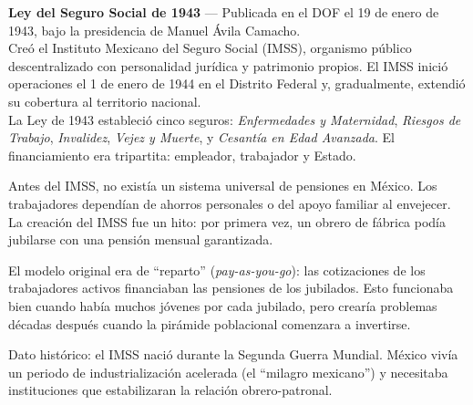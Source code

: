 \documentclass[11pt,a4paper]{report}
\begin{document}
\begin{tcolorbox}[colback=blue!5!white, colframe=blue!75!black, title=\textbf{Definici\'on Formal}]
\textbf{Ley del Seguro Social de 1943} --- Publicada en el DOF el 19 de enero de 1943, bajo la presidencia de Manuel \'Avila Camacho.\\[0.3em]
Cre\'o el Instituto Mexicano del Seguro Social (IMSS), organismo p\'ublico descentralizado con personalidad jur\'idica y patrimonio propios. El IMSS inici\'o operaciones el 1 de enero de 1944 en el Distrito Federal y, gradualmente, extendi\'o su cobertura al territorio nacional.\\[0.3em]
La Ley de 1943 estableci\'o cinco seguros: \emph{Enfermedades y Maternidad}, \emph{Riesgos de Trabajo}, \emph{Invalidez}, \emph{Vejez y Muerte}, y \emph{Cesant\'ia en Edad Avanzada}. El financiamiento era tripartita: empleador, trabajador y Estado.
\end{tcolorbox}

\begin{tcolorbox}[colback=green!5!white, colframe=green!50!black, title=\textbf{Intuici\'on}]
Antes del IMSS, no exist\'ia un sistema universal de pensiones en M\'exico. Los trabajadores depend\'ian de ahorros personales o del apoyo familiar al envejecer. La creaci\'on del IMSS fue un hito: por primera vez, un obrero de f\'abrica pod\'ia jubilarse con una pensi\'on mensual garantizada.

El modelo original era de ``reparto'' (\emph{pay-as-you-go}): las cotizaciones de los trabajadores activos financiaban las pensiones de los jubilados. Esto funcionaba bien cuando hab\'ia muchos j\'ovenes por cada jubilado, pero crear\'ia problemas d\'ecadas despu\'es cuando la pir\'amide poblacional comenzara a invertirse.

Dato hist\'orico: el IMSS naci\'o durante la Segunda Guerra Mundial. M\'exico viv\'ia un periodo de industrializaci\'on acelerada (el ``milagro mexicano'') y necesitaba instituciones que estabilizaran la relaci\'on obrero-patronal.
\end{tcolorbox}
\end{document}
